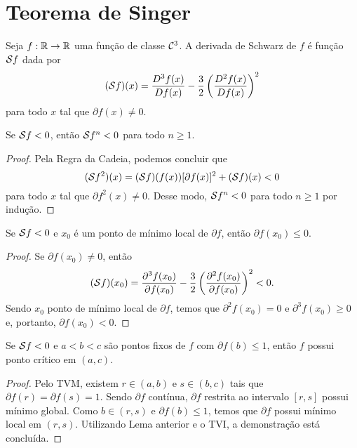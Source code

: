 \section{Teorema de Singer}

\begin{definition}
Seja $f: \mathbb{R} \to \mathbb{R}$ uma função de classe $\mathcal{C}^3$.
A derivada de Schwarz de $f$ é função $\mathcal{S} f$ dada por
$$(\mathcal{S} f)(x) = \frac{D^3 f(x)}{D f(x)} - \frac{3}{2} \left( \frac{D^2 f(x)}{D f(x)} \right)^2$$
para todo $x$ tal que $\partial f(x) \neq 0$.
\end{definition}

\begin{proposition}
Se $\mathcal{S} f < 0$, então $\mathcal{S} f^n < 0$ para todo $n \geq 1$.
\end{proposition}

\begin{proof}
Pela Regra da Cadeia, podemos concluir que
$$(\mathcal{S} f^2)(x) = (\mathcal{S} f)(f(x)) [\partial f(x)]^2 + (\mathcal{S} f)(x) < 0$$
para todo $x$ tal que $\partial f^2(x) \neq 0$.
Desse modo, $\mathcal{S} f^n < 0$ para todo $n \geq 1$ por indução.
\end{proof}

\begin{lemma}
\label{lemma1}
Se $\mathcal{S} f < 0$ e $x_0$ é um ponto de mínimo local de $\partial f$, então $\partial f(x_0) \leq 0$.
\end{lemma}

\begin{proof}
Se $\partial f(x_0) \neq 0$, então
$$(\mathcal{S} f)(x_0) = \frac{\partial^3 f(x_0)}{\partial f(x_0)} - \frac{3}{2} \left( \frac{\partial^2 f(x_0)}{\partial f(x_0)} \right)^2 < 0.$$
Sendo $x_0$ ponto de mínimo local de $\partial f$, temos que $\partial^2 f(x_0) = 0$ e $\partial^3 f(x_0) \geq 0$ e, portanto, $\partial f(x_0) < 0$. 
\end{proof}

\begin{lemma}
\label{lemma2}
Se $\mathcal{S} f < 0$ e $a<b<c$ são pontos fixos de $f$ com $\partial f(b) \leq 1$, então $f$ possui ponto crítico em $(a, c)$.
\end{lemma}

\begin{proof}
Pelo TVM, existem $r \in (a,b)$ e $s \in (b,c)$  tais que $\partial f(r) = \partial f(s) = 1$.
Sendo $\partial f$ contínua, $\partial f$ restrita ao intervalo $[r,s]$ possui mínimo global.
Como $b \in (r,s)$ e $\partial f(b) \leq 1$, temos que $\partial f$ possui mínimo local em $(r,s)$.
Utilizando Lema anterior e o TVI, a demonstração está concluída.
\end{proof}

